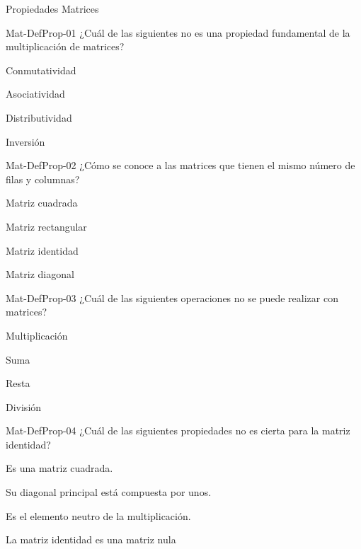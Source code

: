 \documentclass[a4,11pt]{aleph-notas}
\begin{document}
\begin{quiz}{Propiedades Matrices}

\begin{multi}[]%
    {Mat-DefProp-01}
    ¿Cuál de las siguientes no es una propiedad fundamental de la multiplicación de matrices?
    \item* Conmutatividad
    \item Asociatividad
    \item Distributividad
    \item Inversión
\end{multi}

\begin{multi}[]%
    {Mat-DefProp-02}
    ¿Cómo se conoce a las matrices que tienen el mismo número de filas y columnas?
    \item* Matriz cuadrada
    \item Matriz rectangular
    \item Matriz identidad
    \item Matriz diagonal
\end{multi}

\begin{multi}[]%
    {Mat-DefProp-03}
    ¿Cuál de las siguientes operaciones no se puede realizar con matrices?
    \item Multiplicación
    \item Suma
    \item Resta
    \item* División
\end{multi}

\begin{multi}[]%
    {Mat-DefProp-04}
    ¿Cuál de las siguientes propiedades no es cierta para la matriz identidad?
    \item Es una matriz cuadrada.
    \item Su diagonal principal está compuesta por unos.
    \item Es el elemento neutro de la multiplicación.
    \item* La matriz identidad es una matriz nula
\end{multi}


\end{quiz}
\end{document}

